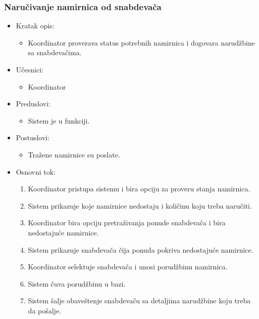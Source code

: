 

\subsubsection{Naručivanje namirnica od snabdevača}


\begin{itemize}
	\item Kratak opis:
		\begin{itemize}
			\item Koordinator proverava status potrebnih namirnica i dogovara narudžbine sa snabdevačima.
		\end{itemize}
	\item Učesnici:
		\begin{itemize}
		    \item Koordinator
		\end{itemize}
	\item Preduslovi:
		\begin{itemize}
		   
		    \item Sistem je u funkciji.
		\end{itemize}
	\item Postuslovi:
		\begin{itemize}
			\item Tražene namirnice su poslate.
	\end{itemize}
	\item Osnovni tok:
		\begin{enumerate}
            \item Koordinator pristupa sistemu i bira opciju za proveru stanja namirnica.
           \item Sistem prikazuje koje namirnice nedostaju i količinu koju treba naručiti.
           \item Koordinator bira opciju pretraživanja ponude snabdevača i bira nedostajuće namirnice.
            \item Sistem prikazuje snabdevača čija ponuda pokriva nedostajuće namirnice. 
             \item  Koordinator selektuje snabdevača i unosi porudžbinu namirnica.
              \item Sistem čuva porudžbinu u bazi.
             \item Sistem šalje obaveštenje snabdevaču sa detaljima narudžbine koju treba da pošalje.
            

\end{enumerate}
\end{itemize}
